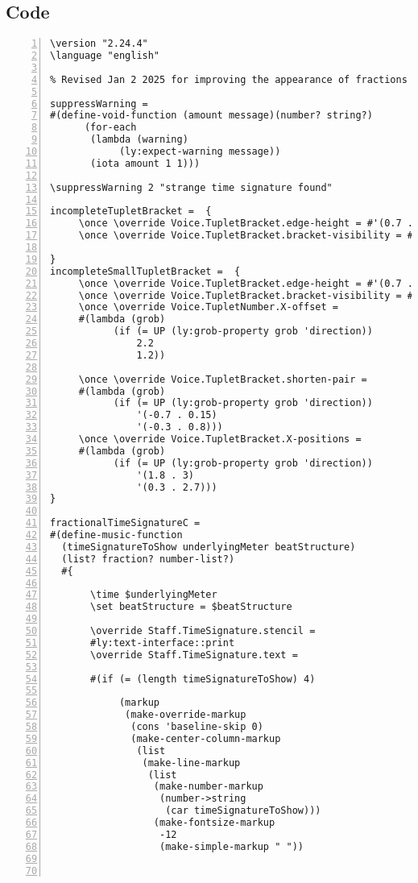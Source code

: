 \subsection{Code}
\begin{Verbatim}[numbers=left,xleftmargin=5mm]
\version "2.24.4"
\language "english"

% Revised Jan 2 2025 for improving the appearance of fractions

suppressWarning =
#(define-void-function (amount message)(number? string?)
      (for-each
       (lambda (warning)
            (ly:expect-warning message))
       (iota amount 1 1)))

\suppressWarning 2 "strange time signature found"

incompleteTupletBracket =  {
     \once \override Voice.TupletBracket.edge-height = #'(0.7 . 0)
     \once \override Voice.TupletBracket.bracket-visibility = ##t

}
incompleteSmallTupletBracket =  {
     \once \override Voice.TupletBracket.edge-height = #'(0.7 . 0)
     \once \override Voice.TupletBracket.bracket-visibility = ##t
     \once \override Voice.TupletNumber.X-offset =
     #(lambda (grob)
           (if (= UP (ly:grob-property grob 'direction))
               2.2
               1.2))

     \once \override Voice.TupletBracket.shorten-pair =
     #(lambda (grob)
           (if (= UP (ly:grob-property grob 'direction))
               '(-0.7 . 0.15)
               '(-0.3 . 0.8)))
     \once \override Voice.TupletBracket.X-positions =
     #(lambda (grob)
           (if (= UP (ly:grob-property grob 'direction))
               '(1.8 . 3)
               '(0.3 . 2.7)))
}

fractionalTimeSignatureC =
#(define-music-function
  (timeSignatureToShow underlyingMeter beatStructure)
  (list? fraction? number-list?)
  #{

       \time $underlyingMeter
       \set beatStructure = $beatStructure

       \override Staff.TimeSignature.stencil =
       #ly:text-interface::print
       \override Staff.TimeSignature.text =

       #(if (= (length timeSignatureToShow) 4)

            (markup
             (make-override-markup
              (cons 'baseline-skip 0)
              (make-center-column-markup
               (list
                (make-line-markup
                 (list
                  (make-number-markup
                   (number->string
                    (car timeSignatureToShow)))
                  (make-fontsize-markup
                   -12
                   (make-simple-markup " "))



\end{Verbatim}

